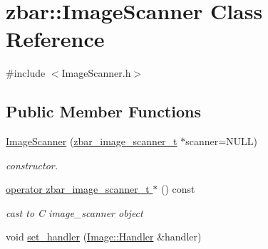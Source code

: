 \hypertarget{classzbar_1_1_image_scanner}{
\section{zbar::ImageScanner Class Reference}
\label{classzbar_1_1_image_scanner}
}


{\ttfamily \#include $<$ImageScanner.h$>$}

\subsection*{Public Member Functions}
\begin{DoxyCompactItemize}
\item 
\hypertarget{classzbar_1_1_image_scanner_a7f682e2ac7fedad5bd898cb9282cb00d}{
\hyperlink{classzbar_1_1_image_scanner_a7f682e2ac7fedad5bd898cb9282cb00d}{ImageScanner} (\hyperlink{zbar_8h_afe85585d1f7e90b1092b0d8420b8f577}{zbar\_\-image\_\-scanner\_\-t} $\ast$scanner=NULL)}
\label{classzbar_1_1_image_scanner_a7f682e2ac7fedad5bd898cb9282cb00d}

\begin{DoxyCompactList}\small\item\em constructor. \end{DoxyCompactList}\item 
\hypertarget{classzbar_1_1_image_scanner_a597bb264b220f5185095be78376d2077}{
\hyperlink{classzbar_1_1_image_scanner_a597bb264b220f5185095be78376d2077}{operator zbar\_\-image\_\-scanner\_\-t $\ast$} () const }
\label{classzbar_1_1_image_scanner_a597bb264b220f5185095be78376d2077}

\begin{DoxyCompactList}\small\item\em cast to C image\_\-scanner object \end{DoxyCompactList}\item 
\hypertarget{classzbar_1_1_image_scanner_a71c9944f89df97c81eae00d0ada446f5}{
void \hyperlink{classzbar_1_1_image_scanner_a71c9944f89df97c81eae00d0ada446f5}{set\_\-handler} (\hyperlink{classzbar_1_1_image_1_1_handler}{Image::Handler} \&handler)}
\label{classzbar_1_1_image_scanner_a71c9944f89df97c81eae00d0ada446f5}


\end{DoxyCompactItemize}
